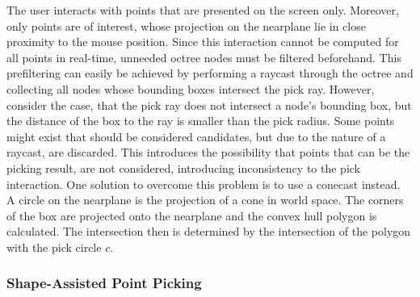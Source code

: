 The user interacts with points that are presented on the screen only. Moreover, only points are of interest, whose projection on the nearplane lie in close proximity to the mouse position. Since this interaction cannot be computed for all points in real-time, unneeded octree nodes must be filtered beforehand. This prefiltering can easily be achieved by performing a raycast through the octree and collecting all nodes whose bounding boxes intersect the pick ray. However, consider the case, that the pick ray does not intersect a node's bounding box, but the distance of the box to the ray is smaller than the pick radius. Some points might exist that should be considered candidates, but due to the nature of a raycast, are discarded. This introduces the possibility that points that can be the picking result, are not considered, introducing inconsistency to the pick interaction. One solution to overcome this problem is to use a conecast instead. 
\\
A circle on the nearplane is the projection of a cone in world space. The corners of the box are projected onto the nearplane and the convex hull polygon is calculated. The intersection then is determined by the intersection of the polygon with the pick circle $c$. 


\subsubsection{Shape-Assisted Point Picking}
\label {sec:picking_assisted}

